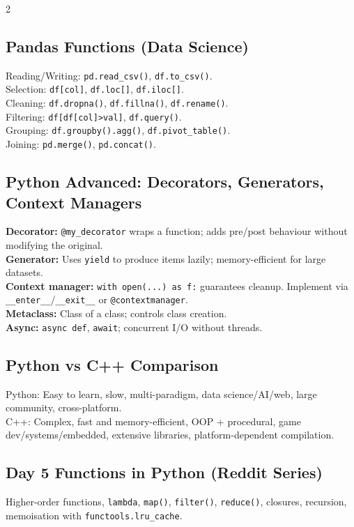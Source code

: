 \documentclass[10pt,a4paper]{article}
\begin{document}
\begin{multicols}{2}
\subsection{Pandas Functions (Data Science)}
Reading/Writing: \texttt{pd.read\_csv()}, \texttt{df.to\_csv()}.\\
Selection: \texttt{df[col]}, \texttt{df.loc[]}, \texttt{df.iloc[]}.\\
Cleaning: \texttt{df.dropna()}, \texttt{df.fillna()}, \texttt{df.rename()}.\\
Filtering: \texttt{df[df[col]>val]}, \texttt{df.query()}.\\
Grouping: \texttt{df.groupby().agg()}, \texttt{df.pivot\_table()}.\\
Joining: \texttt{pd.merge()}, \texttt{pd.concat()}.

\subsection{Python Advanced: Decorators, Generators, Context Managers}
\textbf{Decorator:} \texttt{@my\_decorator} wraps a function; adds pre/post behaviour without modifying the original.\\
\textbf{Generator:} Uses \texttt{yield} to produce items lazily; memory-efficient for large datasets.\\
\textbf{Context manager:} \texttt{with open(...) as f:} guarantees cleanup. Implement via \texttt{\_\_enter\_\_}/\texttt{\_\_exit\_\_} or \texttt{@contextmanager}.\\
\textbf{Metaclass:} Class of a class; controls class creation.\\
\textbf{Async:} \texttt{async def}, \texttt{await}; concurrent I/O without threads.

\subsection{Python vs C++ Comparison}
Python: Easy to learn, slow, multi-paradigm, data science/AI/web, large community, cross-platform.\\
C++: Complex, fast and memory-efficient, OOP + procedural, game dev/systems/embedded, extensive libraries, platform-dependent compilation.

\subsection{Day 5 Functions in Python (Reddit Series)}
Higher-order functions, \texttt{lambda}, \texttt{map()}, \texttt{filter()}, \texttt{reduce()}, closures, recursion, memoisation with \texttt{functools.lru\_cache}.


\end{multicols}
\end{document}
